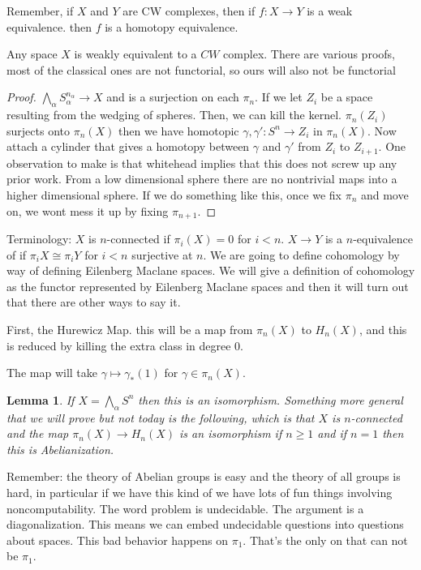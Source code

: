 \documentclass[12pt]{article}
\newtheorem{lemma}[theorem]{Lemma}
\theoremstyle{definition}
\begin{document}
Remember, if $X$ and $Y$ are CW complexes, then if $f:X\to Y$ is a weak equivalence. then $f$ is a homotopy equivalence. 

Any space $X$ is weakly equivalent to a $CW$ complex. There are various proofs, most of the classical ones are not functorial, so ours will also not be functorial
\begin{proof}
	$\bigwedge_{\alpha}S_\alpha^{n_\alpha}\to X$ and is a surjection on each $\pi_n$. If we let $Z_i$ be a space resulting from the wedging of spheres. Then, we can kill the kernel. $\pi_n(Z_i)$ surjects onto $\pi_n(X)$ then we have homotopic $\gamma, \gamma':S^n\to Z_i$ in $\pi_n(X)$. Now attach a cylinder that gives a homotopy between $\gamma $ and $\gamma'$ from $Z_i$ to $Z_{i+1}$. One observation to make is that whitehead implies that this does not screw up any prior work. From a low dimensional sphere there are no nontrivial maps into a higher dimensional sphere. If we do something like this, once we fix $\pi_n$ and move on, we wont mess it up by fixing $\pi_{n+1}$.  \end{proof}

Terminology:
$X$ is $n$-connected if $\pi_i(X)=0$ for $i< n$. $X\to Y$ is a $n$-equivalence of if $\pi_i X\cong \pi_i Y$ for $i< n$ surjective at $n$. We are going to define cohomology by way of defining Eilenberg Maclane spaces. We will give a definition of cohomology as the functor represented by Eilenberg Maclane spaces and then it will turn out that there are other ways to say it. 

First, the Hurewicz Map. this will be a map from $\pi_n(X)$ to $H_n(X)$, and this is reduced by killing the extra class in degree $0$. 

The map will take $\gamma\mapsto \gamma_\ast(1)$ for $\gamma\in \pi_n(X)$. 

\begin{lemma}{1}
	If $X=\bigwedge_\alpha S^n$ then this is an isomorphism. Something more general that we will prove but not today is the following, which is that $X$ is $n$-connected and the map $\pi_n(X)\to H_n(X)$ is an isomorphism if $n\geq 1$ and if $n=1$ then this is Abelianization. 	
\end{lemma} 

Remember: the theory of Abelian groups is easy and the theory of all groups is hard, in particular if we have this kind of we have lots of fun things involving noncomputability. The word problem is undecidable. The argument is a diagonalization. This means we can embed undecidable questions into questions about spaces. This bad behavior happens on $\pi_1$. That's the only on that can not be $\pi_1$. 
\end{document}
